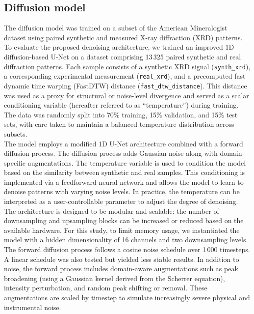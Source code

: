 \clearpage
\subsection{Diffusion model}


The diffusion model was trained on a subset of the American Mineralogist dataset using paired synthetic and measured X-ray diffraction (XRD) patterns.
To evaluate the proposed denoising architecture, we trained an improved 1D diffusion-based U-Net on a dataset comprising 13\,325 paired synthetic and real diffraction patterns. Each sample consists of a synthetic XRD signal (\texttt{synth\_xrd}), a corresponding experimental measurement (\texttt{real\_xrd}), and a precomputed fast dynamic time warping (FastDTW) distance (\texttt{fast\_dtw\_distance}). This distance was used as a proxy for structural or noise-level divergence and served as a scalar conditioning variable (hereafter referred to as ``temperature'') during training. The data was randomly split into 70\% training, 15\% validation, and 15\% test sets, with care taken to maintain a balanced temperature distribution across subsets.\\

The model employs a modified 1D U-Net architecture combined with a forward diffusion process. The diffusion process adds Gaussian noise along with domain-specific augmentations. The temperature variable is used to condition the model based on the similarity between synthetic and real samples. This conditioning is implemented via a feedforward neural network and allows the model to learn to denoise patterns with varying noise levels. In practice, the temperature can be interpreted as a user-controllable parameter to adjust the degree of denoising. The architecture is designed to be modular and scalable: the number of downsampling and upsampling blocks can be increased or reduced based on the available hardware. For this study, to limit memory usage, we instantiated the model with a hidden dimensionality of 16 channels and two downsampling levels.\\

The forward diffusion process follows a cosine noise schedule over 1\,000 timesteps. A linear schedule was also tested but yielded less stable results. In addition to noise, the forward process includes domain-aware augmentations such as peak broadening (using a Gaussian kernel derived from the Scherrer equation), intensity perturbation, and random peak shifting or removal. These augmentations are scaled by timestep to simulate increasingly severe physical and instrumental noise.\\

